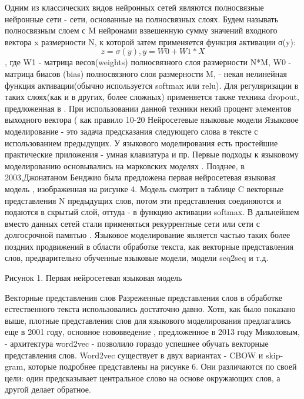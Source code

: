 Одним из классических видов нейронных сетей являются полносвязные нейронные сети - сети, основанные на полносвязных слоях. Будем называть полносвязным слоем с M нейронами взвешенную сумму значений входного вектора x размерности N, к которой затем применяется функция активации σ(y): $$z = σ(y), y = W0+W1*X$$, где W1 - матрица весов(weights) полносвязного слоя размерности N*M, W0 - матрица биасов (bias) полносвязного слоя размерности M, \sigma - некая нелинейная функция активации(обычно используется softmax или relu). Для регуляризации в таких слоях(как и в других, более сложных) применяется также техника dropout, предложенная в \cite{JMLR:v15:srivastava14a}.  При использовании данной техники некий процент элементов выходного вектора ( как правило 10-20%
Нейросетевые языковые модели
Языковое моделирование - это задача предсказания следующего слова в тексте с использованием предыдущих. У языкового моделирования есть простейшие практические приложения - умная клавиатура и пр. Первые подходы к языковому моделированию основывались на марковских моделях\cite{Kneser_Ney_1995} . Позднее, в 2003,Джонатаном Бенджио была предложена первая нейросетевая языковая модель \cite{Bengio_Ducharme_Vincent_Janvin_2003}, изображенная на рисунке 4. 
Модель смотрит в таблице  C векторные представления N предыдущих слов, потом эти представления соединяются и подаются в скрытый слой, оттуда - в функцию активации softmax. В дальнейшем вместо данных сетей стали применяться рекуррентные сети \cite{Mikolov_Karafiát_Burget_Černocký_Khudanpur_2010} или сети с долгосрочной памятью \cite{Hochreiter_Schmidhuber_1997}.
Языковое моделирование является частью таких более поздних продвижений в области обработке текста, как векторные представления слов, предварительно обученные языковые модели, модели seq2seq и т.д.

Рисунок 1. Первая нейросетевая языковая модель

Векторные представления слов
Разреженные представления слов в обработке естественного текста использовались достаточно давно. Хотя, как было показано выше, плотные представления слов для языкового моделирования предлагались еще в 2001 году, основное нововведение \cite{Mikolov_Chen_Corrado_Dean_2013}, предложенное в 2013 году Миколовым, - архитектура word2vec - позволило гораздо успешнее обучать векторные представления слов. Word2vec существует в двух вариантах - CBOW и skip-gram, которые подробнее представлены на рисунке 6. Они различаются по своей цели: один предсказывает центральное слово на основе окружающих слов, а другой делает обратное.


